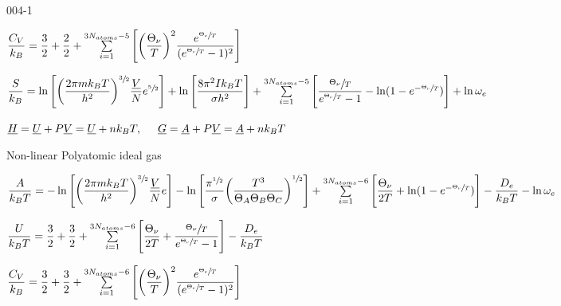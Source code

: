 \begin{mitframe}{004-1}
\begin{listone}
    
    \item $\dfrac{\cv}{\boltz}=\dfrac{3}{2}+\dfrac{2}{2}+\sum\limits_{i=1}^{3\nummoles_{atoms}-5}\Bigg[\bigg(\dfrac{\vibrfreqfac}{\Temp}\bigg)^{2}\dfrac{e^{\sfrac{\vibrfreqfac}{\Temp}}}{(e^{\sfrac{\vibrfreqfac}{\Temp}}-1)^{2}}\Bigg]$
           
    
    \item $\dfrac{\entropy}{\boltz}=\ln\Bigg[\bigg(\dfrac{2\pie\mass\boltz\Temp}{\planck^{2}}\bigg)^{\sfrac{3}{2}}\dfrac{\uline{\vol}}{\nummoles}e^{\sfrac{5}{2}}\Bigg]+\ln\Bigg[\dfrac{8\pie^{2}\mominertia\boltz\Temp}{\molecrad\planck^{2}}\Bigg]+\sum\limits_{i=1}^{3\nummoles_{atoms}-5}\Bigg[\dfrac{\sfrac{\vibrfreqfac}{\Temp}}{e^{\sfrac{\vibrfreqfac}{\Temp}}-1}-\ln(1-e^{-\sfrac{\vibrfreqfac}{\Temp}})\Bigg]+\ln\elecdegen$          
            
    \item $\uline{\enthalpy}=\uline{\intenergy}+\p\uline{\vol}=\uline{\intenergy}+n\boltz\Temp,\tab \uline{\gibbs}=\uline{\helmholtz}+\p\uline{\vol}=\uline{\helmholtz}+n\boltz\Temp$
    
            
    \item Non-linear Polyatomic ideal gas 
       
   	\item $\dfrac{\helmholtz}{\boltz\Temp}=-\ln\Bigg[\bigg(\dfrac{2\pie\mass\boltz\Temp}{\planck^{2}}\bigg)^{\sfrac{3}{2}}\dfrac{\uline{\vol}}{\nummoles}e\Bigg]-\ln\Bigg[\dfrac{\pie^{\sfrac{1}{2}}}{\molecrad}\bigg(\dfrac{\Temp^{3}}{\dimltemp_{A}\dimltemp_{B}\dimltemp_{C}}\bigg)^{\sfrac{1}{2}}\Bigg]+\sum\limits_{i=1}^{3\nummoles_{atoms}-6}\Bigg[\dfrac{\vibrfreqfac}{2\Temp}+\ln(1-e^{-\sfrac{\vibrfreqfac}{\Temp}})\Bigg]-\dfrac{\eneatom}{\boltz\Temp}-\ln\elecdegen$
    
    
    \item $\dfrac{\intenergy}{\boltz\Temp}=\dfrac{3}{2}+\dfrac{3}{2}+\sum\limits_{i=1}^{3\nummoles_{atoms}-6}\Bigg[\dfrac{\vibrfreqfac}{2\Temp}+\dfrac{\sfrac{\vibrfreqfac}{\Temp}}{e^{\sfrac{\vibrfreqfac}{\Temp}}-1}\Bigg]-\dfrac{\eneatom}{\boltz\Temp}$
    
    \item $\dfrac{\cv}{\boltz}=\dfrac{3}{2}+\dfrac{3}{2}+\sum\limits_{i=1}^{3\nummoles_{atoms}-6}\Bigg[\bigg(\dfrac{\vibrfreqfac}{\Temp}\bigg)^{2}\dfrac{e^{\sfrac{\vibrfreqfac}{\Temp}}}{(e^{\sfrac{\vibrfreqfac}{\Temp}}-1)^{2}}\Bigg]$
    

\end{listone}
\end{mitframe}
